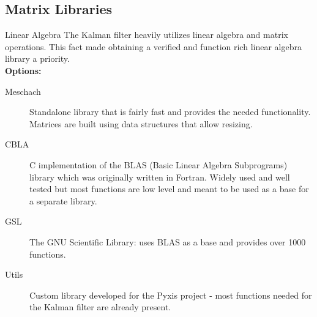 \documentclass[10pt, handout, aspectratio=169]{beamer}
\begin{document}
\subsection{Matrix Libraries}
	\begin{frame}[t]{Linear Algebra}
		The Kalman filter heavily utilizes linear algebra and matrix operations. This fact made obtaining a verified and function rich linear algebra library a priority.\\
		\vspace{0.5em}
		\textbf{Options:}
		\begin{description}
			\item[Meschach] Standalone library that is fairly fast and provides the needed functionality. Matrices are built using data structures that allow resizing.
			\item[CBLA] C implementation of the BLAS (Basic Linear Algebra Subprograms) library which was originally written in Fortran. Widely used and well tested but most functions are low level and meant to be used as a base for a separate library.
			\item[GSL] The GNU Scientific Library: uses BLAS as a base and provides over 1000 functions.
			\item[Utils] Custom library developed for the Pyxis project - most functions needed for the Kalman filter are already present.
		\end{description}

	\end{frame}
\end{document}
